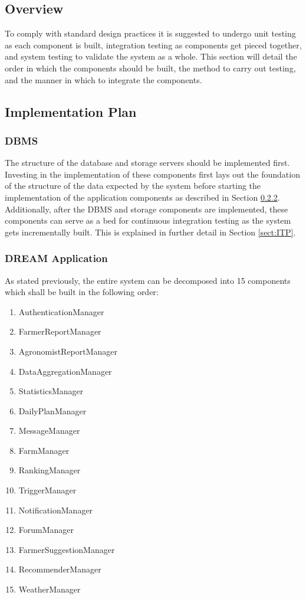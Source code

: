 \subsection{Overview}
\noindent
To comply with standard design practices it is suggested to undergo unit testing as each component is built, integration testing as components get pieced together, and system testing to validate the system as a whole. This section will detail the order in which the components should be built, the method to carry out testing, and the manner in which to integrate the components.

\subsection{Implementation Plan}
\subsubsection{DBMS}
\noindent
The structure of the database and storage servers should be implemented first. Investing in the implementation of these components first lays out the foundation of the structure of the data expected by the system before starting the implementation of the application components as described in Section \ref{sect:AppIIT}. Additionally, after the DBMS and storage components are implemented, these components can serve as a bed for continuous integration testing as the system gets incrementally built. This is explained in further detail in Section \ref{sect:ITP}. 

\subsubsection{DREAM Application}
\label{sect:AppIIT}
\noindent
As stated previously, the entire system can be decomposed into 15 components which shall be built in the following order: 

\begin{enumerate}
\item AuthenticationManager
\item FarmerReportManager
\item AgronomistReportManager
\item DataAggregationManager
\item StatisticsManager
\item DailyPlanManager
\item MessageManager
\item FarmManager
\item RankingManager
\item TriggerManager
\item NotificationManager
\item ForumManager
\item FarmerSuggestionManager
\item RecommenderManager
\item WeatherManager
\end{enumerate}

